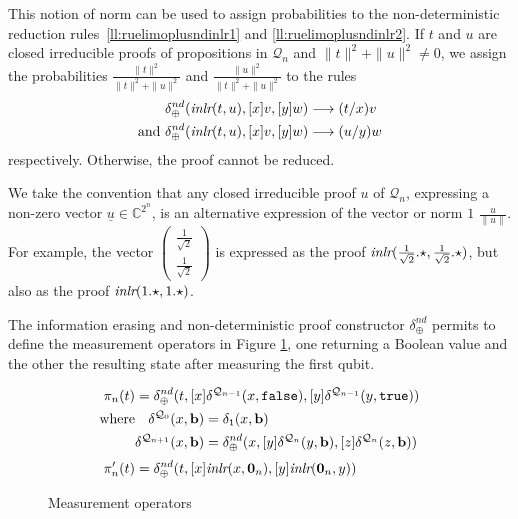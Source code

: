 \documentclass[screen, sigconf,authorversion,nonacm]{acmart}
\theoremstyle{acmdefinition}
\numberwithin{equation}{section}
\newcommand\abstr[1]{[#1]}
\newcommand\inlr{\mbox{\it inlr}}
\newcommand\Q{{\mathcal Q}}
\newcommand\boolzero{{\mathtt{false}}}
\newcommand\boolone{{\mathtt{true}}}
\newcommand\one{\ensuremath{\mathtt 1}}
\newcommand\elimone{\delta_{\one}}
\newcommand\elimplus{\delta_{\oplus}}
\begin{document}
This notion of norm can be used to assign probabilities to the
non-deterministic reduction rules~\eqref{ll:ruelimoplusndinlr1} and
\eqref{ll:ruelimoplusndinlr2}. If $t$ and $u$ are closed irreducible
proofs of propositions in $\Q_n$ and $\|t\|^2+\|u\|^2\neq 0$, we
assign the probabilities $\tfrac{\|t\|^2}{\|t\|^2 + \|u\|^2}$ and
$\tfrac{\|u\|^2}{\|t\|^2 + \|u\|^2}$ to the rules
\begin{align*}
     \elimplus^{nd}(\inlr(t,u),\abstr{x}v,\abstr{y}w) & \longrightarrow  (t/x)v
     \\
    \mbox{and}~\elimplus^{nd}(\inlr(t,u),\abstr{x}v,\abstr{y}w) & \longrightarrow
    (u/y)w 
\end{align*}
respectively. Otherwise, the proof cannot be reduced.

We take the convention that any closed irreducible proof $u$ of
$\Q_n$, expressing a non-zero vector $\underline{u} \in {\mathbb
C}^{2^n}$, is an alternative expression of the vector or norm $1$
$\tfrac{u}{\|u\|}$. For example, the vector
$\left(\begin{smallmatrix}\frac{1}{\sqrt{2}}\\
\frac{1}{\sqrt{2}}\end{smallmatrix}\right)$
is expressed as the proof
$\inlr(\frac{1}{\sqrt{2}}.\star,\frac{1}{\sqrt{2}}.\star)$, but also
as the proof $\inlr(1.\star,1.\star)$.

The information erasing and non-deterministic proof
constructor $\elimplus^{nd}$ permits to define the measurement
operators in Figure \ref{figmesure}, one returning a Boolean value and
the other the resulting state after measuring the first qubit.

\begin{figure}[t]
  \[
    \begin{aligned}
      \pi_n(t)  &=\elimplus^{nd}(t, \abstr{x} \delta^{\Q_{n-1}}({x},{\boolzero}),
      \abstr{y}\delta^{\Q_{n-1}}(y,{\boolone}))\\
      \textrm{where} &
      \begin{aligned}[t]
	\delta^{\Q_0}(x,{\bf b}) &= \elimone(x,{\bf b})\\
	\delta^{\Q_{n+1}}(x,{\bf b}) &= \elimplus^{nd}(x, \abstr{y} \delta^{\Q_{n}}(y,{\bf b}), \abstr{z} \delta^{\Q_{n}}(z,{\bf b})) 
      \end{aligned} \\[.5ex]
      \pi'_n(t)  &=\elimplus^{nd}(t, \abstr{x} \inlr(x,{\bf 0}_n), 
      \abstr{y}\inlr({\bf 0}_n,y))
    \end{aligned}
  \]
  \caption{Measurement operators\label{figmesure}}
\end{figure}
\end{document}

